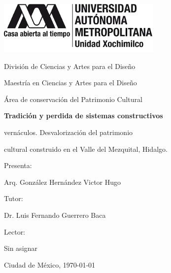 \begin{titlepage}

	{\includegraphics[width=0.6\textwidth]{../imagenes/logo_uam/logo_completo.png}\par}
	\vspace{0.5cm}
	{\large División de Ciencias y Artes para el Diseño\par}
	{\small Maestría en Ciencias y Artes para el Diseño\par}
	{\small Área de conservación del Patrimonio Cultural\par}
	\vspace{1.5cm}
	{\bfseries \Large Tradición y perdida de sistemas constructivos\par vernáculos. Desvalorización del patrimonio\par cultural construido en el Valle del Mezquital, Hidalgo.\par}
	\vspace{1.5cm}
	{\small Presenta:\par}
	{Arq. González Hernández Victor Hugo\par}
	{\small Tutor:\par}
	{Dr. Luis Fernando Guerrero Baca\par}
	{\small Lector:\par}
	{Sin asignar\par}
	\vspace{1cm}
	{\small Ciudad de México, \today \par}

\end{titlepage}
